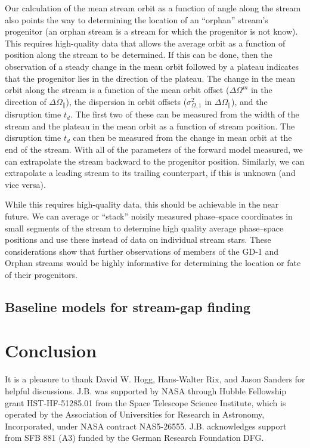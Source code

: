\documentclass[12pt,preprint]{aastex}
\newcommand{\opar}{\ensuremath{\Omega_\parallel}}
\begin{document}
Our calculation of the mean stream orbit as a function of angle along
the stream also points the way to determining the location of an
``orphan'' stream's progenitor (an orphan stream is a stream for which
the progenitor is not know). This requires high-quality data that
allows the average orbit as a function of position along the stream to
be determined. If this can be done, then the observation of a steady
change in the mean orbit followed by a plateau indicates that the
progenitor lies in the direction of the plateau. The change in the
mean orbit along the stream is a function of the mean orbit offset
($\Delta \Omega^m$ in the direction of $\Delta \opar$), the dispersion
in orbit offsets ($\sigma^2_{\Omega,1}$ in $\Delta \opar$), and the
disruption time $t_d$. The first two of these can be measured from the
width of the stream and the plateau in the mean orbit as a function of
stream position. The disruption time $t_d$ can then be measured from
the change in mean orbit at the end of the stream. With all of the
parameters of the forward model measured, we can extrapolate the
stream backward to the progenitor position. Similarly, we can
extrapolate a leading stream to its trailing counterpart, if this is
unknown (and vice versa).

While this requires high-quality data, this should be achievable in
the near future. We can average or ``stack'' noisily measured
phase--space coordinates in small segments of the stream to determine
high quality average phase--space positions and use these instead of
data on individual stream stars. These considerations show that
further observations of members of the GD-1 and Orphan streams would
be highly informative for determining the location or fate of their
progenitors.

\subsection{Baseline models for stream-gap finding}


\section{Conclusion}\label{sec:conclusion}



\acknowledgements It is a pleasure to thank David W. Hogg, Hans-Walter
Rix, and Jason Sanders for helpful discussions. J.B. was supported by
NASA through Hubble Fellowship grant HST-HF-51285.01 from the Space
Telescope Science Institute, which is operated by the Association of
Universities for Research in Astronomy, Incorporated, under NASA
contract NAS5-26555. J.B.  acknowledges support from SFB 881 (A3)
funded by the German Research Foundation DFG.
\end{document}
